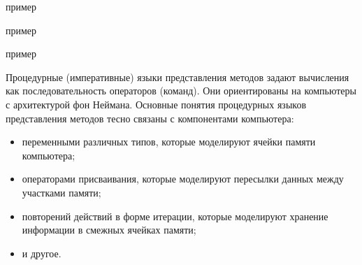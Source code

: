 \begin{SCn}
\begin{scnindent}
    \begin{scneqtoset}
        \begin{scnindent}
            \begin{scnhaselementrolelist}{пример}
            \end{scnhaselementrolelist}
        \end{scnindent}
        \begin{scnindent}
            \begin{scnhaselementrolelist}{пример}
            \end{scnhaselementrolelist}
        \end{scnindent}
        \begin{scnindent}
            \begin{scnhaselementrolelist}{пример}
            \end{scnhaselementrolelist}
        \end{scnindent}
    \end{scneqtoset}
\end{scnindent}
\end{SCn}

Процедурные (императивные) языки представления методов задают вычисления как последовательность операторов (команд).
Они ориентированы на компьютеры с архитектурой фон Неймана. Основные понятия процедурных языков представления методов
тесно связаны с компонентами компьютера:
\begin{itemize}
    \item переменными различных типов, которые моделируют ячейки памяти компьютера;
    \item операторами присваивания, которые моделируют пересылки данных между участками памяти;
    \item повторений действий в форме итерации, которые моделируют хранение информации в смежных ячейках памяти;
    \item и другое.
\end{itemize}

